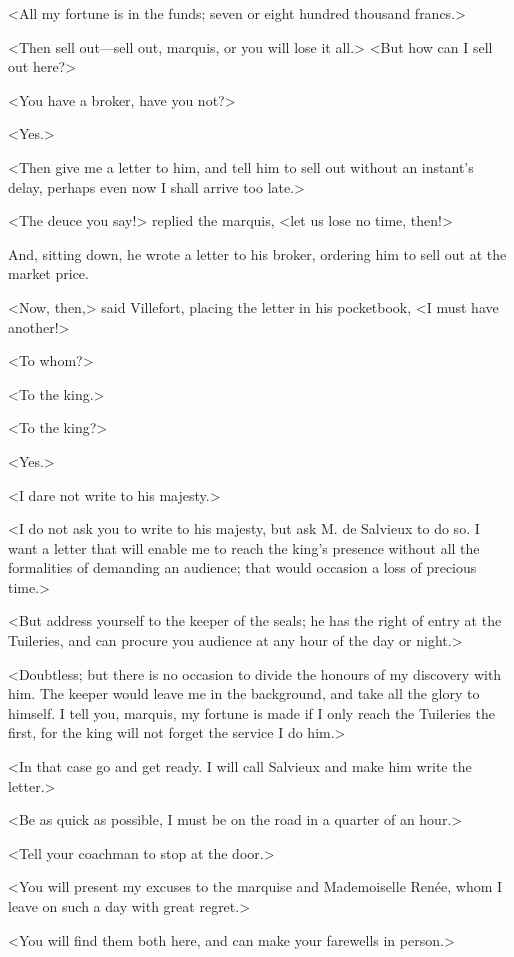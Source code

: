  <All my fortune is in the funds; seven or eight hundred thousand francs.> 

 <Then sell out—sell out, marquis, or you will lose it all.>  <But how can I sell out here?> 

 <You have a broker, have you not?> 

 <Yes.> 

 <Then give me a letter to him, and tell him to sell out without an instant's delay, perhaps even now I shall arrive too late.> 

 <The deuce you say!> replied the marquis, <let us lose no time, then!> 

 And, sitting down, he wrote a letter to his broker, ordering him to sell out at the market price. 

 <Now, then,> said Villefort, placing the letter in his pocketbook, <I must have another!> 

 <To whom?> 

 <To the king.> 

 <To the king?> 

 <Yes.> 

 <I dare not write to his majesty.> 

 <I do not ask you to write to his majesty, but ask M. de Salvieux to do so. I want a letter that will enable me to reach the king's presence without all the formalities of demanding an audience; that would occasion a loss of precious time.> 

 <But address yourself to the keeper of the seals; he has the right of entry at the Tuileries, and can procure you audience at any hour of the day or night.> 

 <Doubtless; but there is no occasion to divide the honours of my discovery with him. The keeper would leave me in the background, and take all the glory to himself. I tell you, marquis, my fortune is made if I only reach the Tuileries the first, for the king will not forget the service I do him.> 

 <In that case go and get ready. I will call Salvieux and make him write the letter.> 

 <Be as quick as possible, I must be on the road in a quarter of an hour.> 

 <Tell your coachman to stop at the door.> 

 <You will present my excuses to the marquise and Mademoiselle Renée, whom I leave on such a day with great regret.> 

 <You will find them both here, and can make your farewells in person.> 

